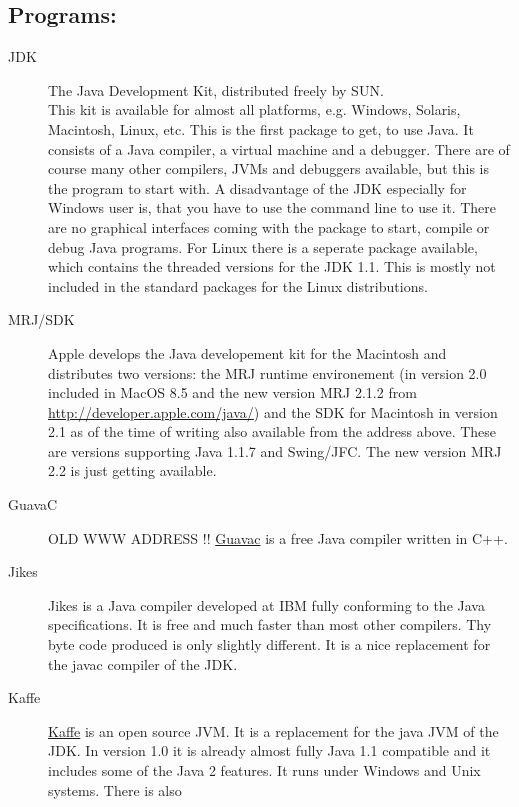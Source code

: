\subsection{Programs:} 
\begin{description}
\item[JDK]  The Java Development Kit, distributed freely by SUN.\\
        This kit is available for almost all platforms, e.g. Windows,
        Solaris, Macintosh, Linux, etc. This is the first package to get,
        to use Java. It consists of a Java compiler, a virtual machine 
        and a debugger. There
        are of course many other compilers, JVMs and debuggers
        available, but this is the program to start with. A disadvantage
        of the JDK especially for Windows user is, that you have to use the
        command line to use it. There are no graphical interfaces  coming with the
        package to start, compile or debug Java programs.
        For Linux there is  a seperate package available, which contains
        the threaded versions for the JDK 1.1. This is mostly not
        included in the standard packages for the Linux distributions.
\item[MRJ/SDK]  Apple develops the Java developement kit for the Macintosh and
  distributes two versions: the MRJ runtime environement (in version 2.0 included
  in MacOS 8.5 and the new version MRJ 2.1.2 from \href{http://developer.apple.com/java/}%
  {http://developer.apple.com/java/}) and the SDK for Macintosh in version
  2.1 as of the time of writing also available from the address above. These are
  versions supporting Java 1.1.7 and Swing/JFC. The new version MRJ 2.2
        is just getting available.
\item[GuavaC]  OLD WWW ADDRESS !!
  \href{http://www.cs.berkeley.edu/~engberg/guavac/}{Guavac} 
  is a free Java compiler written in C++. 
\item[Jikes]  
  Jikes is a Java compiler developed at IBM fully conforming
  to the Java specifications. It is free and much faster than most
  other compilers. Thy byte code produced is only slightly different.
  It is a nice replacement for the javac compiler of the JDK.
\item[Kaffe]  \href{http://www.kaffe.org/}{Kaffe} 
  is an open source 
  JVM. It is a replacement for the java JVM of the JDK. In version 1.0 it is
  already almost fully Java 1.1 compatible and it includes some of the
  Java 2 features. It runs under Windows and Unix systems. There is also

\end{description}
